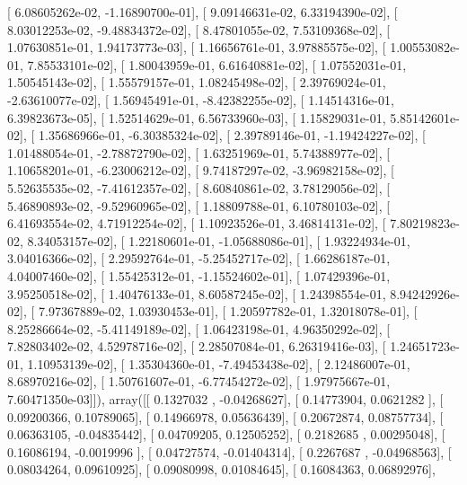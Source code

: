 \documentclass{article}
\begin{document}
       [  6.08605262e-02,  -1.16890700e-01],
       [  9.09146631e-02,   6.33194390e-02],
       [  8.03012253e-02,  -9.48834372e-02],
       [  8.47801055e-02,   7.53109368e-02],
       [  1.07630851e-01,   1.94173773e-03],
       [  1.16656761e-01,   3.97885575e-02],
       [  1.00553082e-01,   7.85533101e-02],
       [  1.80043959e-01,   6.61640881e-02],
       [  1.07552031e-01,   1.50545143e-02],
       [  1.55579157e-01,   1.08245498e-02],
       [  2.39769024e-01,  -2.63610077e-02],
       [  1.56945491e-01,  -8.42382255e-02],
       [  1.14514316e-01,   6.39823673e-05],
       [  1.52514629e-01,   6.56733960e-03],
       [  1.15829031e-01,   5.85142601e-02],
       [  1.35686966e-01,  -6.30385324e-02],
       [  2.39789146e-01,  -1.19424227e-02],
       [  1.01488054e-01,  -2.78872790e-02],
       [  1.63251969e-01,   5.74388977e-02],
       [  1.10658201e-01,  -6.23006212e-02],
       [  9.74187297e-02,  -3.96982158e-02],
       [  5.52635535e-02,  -7.41612357e-02],
       [  8.60840861e-02,   3.78129056e-02],
       [  5.46890893e-02,  -9.52960965e-02],
       [  1.18809788e-01,   6.10780103e-02],
       [  6.41693554e-02,   4.71912254e-02],
       [  1.10923526e-01,   3.46814131e-02],
       [  7.80219823e-02,   8.34053157e-02],
       [  1.22180601e-01,  -1.05688086e-01],
       [  1.93224934e-01,   3.04016366e-02],
       [  2.29592764e-01,  -5.25452717e-02],
       [  1.66286187e-01,   4.04007460e-02],
       [  1.55425312e-01,  -1.15524602e-01],
       [  1.07429396e-01,   3.95250518e-02],
       [  1.40476133e-01,   8.60587245e-02],
       [  1.24398554e-01,   8.94242926e-02],
       [  7.97367889e-02,   1.03930453e-01],
       [  1.20597782e-01,   1.32018078e-01],
       [  8.25286664e-02,  -5.41149189e-02],
       [  1.06423198e-01,   4.96350292e-02],
       [  7.82803402e-02,   4.52978716e-02],
       [  2.28507084e-01,   6.26319416e-03],
       [  1.24651723e-01,   1.10953139e-02],
       [  1.35304360e-01,  -7.49453438e-02],
       [  2.12486007e-01,   8.68970216e-02],
       [  1.50761607e-01,  -6.77454272e-02],
       [  1.97975667e-01,   7.60471350e-03]]), array([[ 0.1327032 , -0.04268627],
       [ 0.14773904,  0.0621282 ],
       [ 0.09200366,  0.10789065],
       [ 0.14966978,  0.05636439],
       [ 0.20672874,  0.08757734],
       [ 0.06363105, -0.04835442],
       [ 0.04709205,  0.12505252],
       [ 0.2182685 ,  0.00295048],
       [ 0.16086194, -0.0019996 ],
       [ 0.04727574, -0.01404314],
       [ 0.2267687 , -0.04968563],
       [ 0.08034264,  0.09610925],
       [ 0.09080998,  0.01084645],
       [ 0.16084363,  0.06892976],
\end{document}
